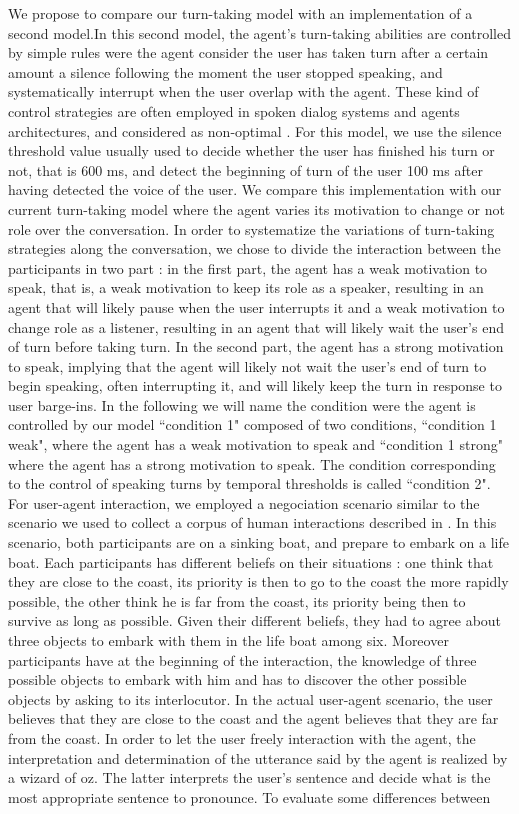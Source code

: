 We propose to compare our turn-taking model with an implementation of a second model.In this second model, the agent's turn-taking abilities are controlled by simple rules were the agent consider the user has taken turn after a certain amount a silence following the moment the user stopped speaking, and systematically interrupt when the user overlap with the agent. These kind of control strategies are often employed in spoken dialog systems and agents architectures, and considered as non-optimal \citep{ward_root_2005}. For this model, we use the silence threshold value usually used to decide whether the user has finished his turn or not, that is 600 ms, and detect the beginning of turn of the user 100 ms after having detected the voice of the user. We compare this implementation with our current turn-taking model where the agent varies its motivation to change or not role over the conversation. In order to systematize the variations of turn-taking strategies along the conversation, we chose to divide the interaction between the participants in two part : in the first part, the agent has a weak motivation to speak, that is, a weak motivation to keep its role as a speaker, resulting in an agent that will likely pause when the user interrupts it and a weak motivation to change role as a listener, resulting in an agent that will likely wait the user's end of turn before taking turn. In the second part, the agent has a strong motivation to speak, implying that the agent will likely not wait the user's end of turn to begin speaking, often interrupting it, and will likely keep the turn in response to user barge-ins. In the following we will name the condition were the agent is controlled by our model ``condition 1" composed of two conditions, ``condition 1 weak", where the agent has a weak motivation to speak and ``condition 1 strong" where the agent has a strong motivation to speak. The condition corresponding to the control of speaking turns by temporal thresholds is called ``condition 2". For user-agent interaction, we employed a negociation scenario similar to the scenario we used to collect a corpus of human interactions described in \cite{jegou_continuous_2015}. In this scenario, both participants are on a sinking boat, and prepare to embark on a life boat. Each participants has different beliefs on their situations : one think that they are close to the coast, its priority is then to go to the coast the more rapidly possible, the other think he is far from the coast, its priority being then to survive as long as possible. Given their different beliefs, they had to agree about three objects to embark with them in the life boat among six. Moreover participants have at the beginning of the interaction, the knowledge of three possible objects to embark with him and has to discover the other possible objects by asking to its interlocutor. In the actual user-agent scenario, the user believes that they are close to the coast and the agent believes that they are far from the coast. In order to let the user freely interaction with the agent, the interpretation and determination of the utterance said by the agent is realized by a wizard of oz. The latter interprets the user's sentence and decide what is the most appropriate sentence to pronounce. To evaluate some differences between 